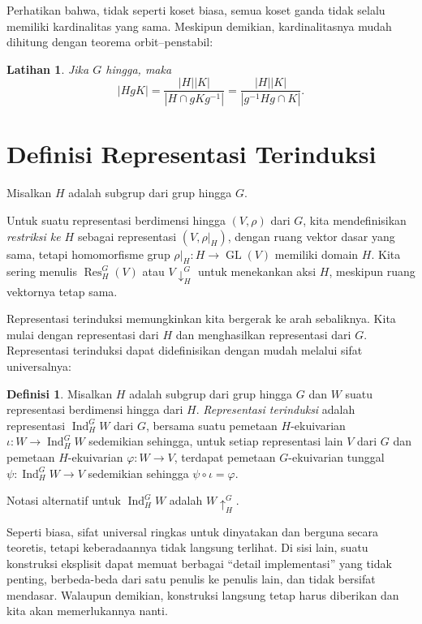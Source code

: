 \documentclass[12pt]{article}
\theoremstyle{plain}
\newtheorem{exercise}[theorem]{Latihan}
\theoremstyle{definition}
\newtheorem{definition}[theorem]{Definisi}
\theoremstyle{remark}
\numberwithin{equation}{section}
\begin{document}
Perhatikan bahwa, tidak seperti koset biasa, semua koset ganda tidak selalu
memiliki kardinalitas yang sama. Meskipun demikian, kardinalitasnya mudah dihitung
dengan teorema orbit--penstabil:

\begin{exercise}
Jika $G$ hingga, maka
\[
|HgK| = \frac{|H| |K|}{|H \cap g K g^{-1}|}=
\frac{|H| |K|}{|g^{-1}Hg \cap K|}.
\]
\end{exercise}

\section{Definisi Representasi Terinduksi}

Misalkan $H$ adalah subgrup dari grup hingga $G$.

Untuk suatu representasi berdimensi hingga
$(V,\rho)$ dari $G$, kita mendefinisikan \emph{restriksi ke
$H$} sebagai representasi $(V,\rho|_H)$, dengan ruang vektor dasar
yang sama, tetapi homomorfisme grup $\rho|_H : H \to
\operatorname{GL}(V)$ memiliki domain $H$.
Kita sering menulis $\operatorname{Res}_H^G(V)$ atau $V {\downarrow}^G_H$
untuk menekankan aksi $H$, meskipun ruang vektornya tetap sama.

Representasi terinduksi memungkinkan kita bergerak ke arah sebaliknya.
Kita mulai dengan representasi dari $H$ dan menghasilkan representasi dari
$G$.
Representasi terinduksi dapat didefinisikan dengan mudah melalui sifat
universalnya:

\begin{definition}
Misalkan $H$ adalah subgrup dari grup hingga $G$ dan
$W$ suatu representasi berdimensi hingga dari $H$.
\emph{Representasi terinduksi} adalah representasi
$\operatorname{Ind}_H^G W$ dari $G$, bersama suatu
pemetaan $H$-ekuivarian $\iota : W \to \operatorname{Ind}_H^G W$ sedemikian sehingga,
untuk setiap representasi lain $V$ dari $G$ dan pemetaan $H$-ekuivarian
$\varphi : W \to V$, terdapat pemetaan $G$-ekuivarian tunggal
$\psi: \operatorname{Ind}_H^G W \to V$ sedemikian sehingga
$\psi \circ \iota = \varphi$.
\end{definition}

Notasi alternatif untuk $\operatorname{Ind}_H^G W$ adalah $W
{\uparrow}_H^G$.

Seperti biasa, sifat universal ringkas untuk dinyatakan dan berguna
secara teoretis, tetapi keberadaannya tidak langsung terlihat.
Di sisi lain, suatu konstruksi eksplisit dapat memuat berbagai
``detail implementasi'' yang tidak penting, berbeda-beda dari satu penulis ke penulis lain,
dan tidak bersifat mendasar.
Walaupun demikian, konstruksi langsung tetap harus diberikan dan kita
akan memerlukannya nanti.
\end{document}
